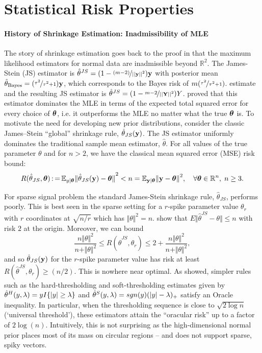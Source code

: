 \documentclass[11pt]{article}
\begin{document}
\section{Statistical Risk Properties}\label{sec:stat-prop}

\paragraph{History of Shrinkage Estimation: Inadmissibility of MLE } The story
of shrinkage estimation goes back to the proof in
\citet{stein_inadmissibility_1956} that the maximum likelihood estimators for
normal data are inadmissible beyond $\mathbb{R}^2$. The James-Stein (JS) estimator
is $\hat{\theta}^{JS} = (1 - \nicefrac{(m-2)}{\left|\left|{\bf y}\right|\right|^2}){\bf y}$ with
posterior mean $\hat{\theta}_{\mathrm{Bayes}} = (\nicefrac{\tau^2}{\tau^2+1})
{\bf y}$, which corresponds to the Bayes risk of $m(\nicefrac{\tau^2}{\tau^2+1})$.
estimate and the resulting JS estimator is $\hat{\theta}^{JS} = (1 -
\nicefrac{m-2}{\left|\left|{\bf Y}\right|\right|^2})Y$. 
\citet{james_estimation_1961} proved that this estimator dominates the MLE in
terms of the expected total squared error for every choice of $\boldsymbol{\theta}$, i.e.
it outperforms the MLE no matter what the true $\boldsymbol{\theta}$ is. To motivate the
need for developing new prior distributions, consider the classic James--Stein
``global'' shrinkage rule, ${\hat{\theta}}_{JS}{}({\bf y})$. The JS estimator uniformly dominates the
traditional sample mean estimator, $\hat{\theta}$. For all values of the true
parameter $\theta$ and for $n>2$, we have the classical mean squared error
(MSE) risk bound:
\[ 
  R({\hat{\theta}}_{JS}{}, \boldsymbol{\theta}) \operatorname{:=} \mathbb E_{y \mid \boldsymbol{\theta}} {\Vert {\hat{\theta}}_{JS}{}({\bf y}) - \boldsymbol{\theta}
  \Vert}^2 < n = \mathbb E_{{\bf y} \mid \boldsymbol{\theta}} {\Vert {\bf y} - \boldsymbol{\theta} \Vert}^2, \quad
  \forall \boldsymbol{\theta} \in \mathbb{R}^n, \; n \ge 3.  
\]

For sparse signal problem the standard James-Stein shrinkage rule, $
\hat{\theta}_{JS} $, performs poorly. This is best seen in the sparse setting
for a $r$-spike parameter value $ \theta_r$ with $r$ coordinates at $
\sqrt{n/r} $ which has $ \Vert \theta \Vert^2 =n $.
\citet{johnstone2004needles} show that $ E \Vert \hat{\theta}^{JS} - \theta
\Vert \leq n $ with risk $2$ at the origin. Moreover, we can bound
\[
  \frac{n \Vert \theta \Vert^2}{ n + \Vert \theta \Vert^2} \leq R \left (
  \hat{\theta}^{JS} , \theta_r \right ) \leq 2 + \frac{n \Vert \theta \Vert^2}{ n
  + \Vert \theta \Vert^2},
\]
and so ${\hat{\theta}}_{JS}{}({\bf y})$ for the $r$-spike parameter value has risk at least $ R
\left( \hat{\theta}^{JS} , \theta_r \right) \geq (n/2)$. This is nowhere near
optimal. As \citet{donoho1994ideal} showed, simpler rules such as the
hard-thresholding and soft-thresholding estimates given by
$\hat{\theta}^{H}(y,\lambda) = y I\{\lvert y\rvert \ge \lambda \}$ and
$\hat{\theta}^{S}(y,\lambda) = sgn(y) (\lvert y\rvert - \lambda)_{+}$ satisfy an
Oracle inequality. In particular, when the thresholding sequence is close to
$\sqrt{2\log n}$ (`universal threshold'), these estimators attain the
``oracular risk'' up to a factor of $2\log(n)$. Intuitively, this is not
surprising as the high-dimensional normal prior places most of its mass on
circular regions -- and does not support sparse, spiky vectors. 
\end{document}
